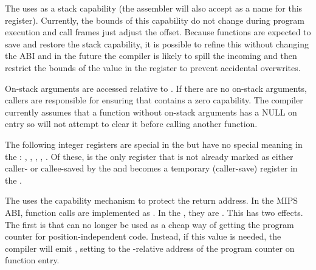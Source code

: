 The \sandboxABI{} uses  as a stack capability (the assembler will also accept  as a name for this register).
Currently, the bounds of this capability do not change during program execution and call frames just adjust the offset.
Because functions are expected to save and restore the stack capability, it is possible to refine this without changing the ABI and in the future the compiler is likely to spill the incoming  and then restrict the bounds of the value in the register to prevent accidental overwrites.

On-stack arguments are accessed relative to .
If there are no on-stack arguments, callers are responsible for ensuring that  contains a zero capability.
The compiler currently assumes that a function without on-stack arguments has a NULL  on entry so will not attempt to clear it
before calling another function.



The following integer registers are special in the \mipsABI{} but have no special meaning in the \sandboxABI{}:
, , , , .
Of these,  is the only register that is not already marked as either caller- or callee-saved by the \mipsABI{} and becomes a temporary (caller-save) register in the \sandboxABI{}.

The \sandboxABI{} uses the capability mechanism to protect the return address.
In the MIPS ABI, function calls are implemented as .
In the \sandboxABI{}, they are .
This has two effects.
The first is that  can no longer be used as a cheap way of getting the program counter for position-independent code.
Instead, if this value is needed, the compiler will emit , setting  to the -relative address of the program counter on function entry.

